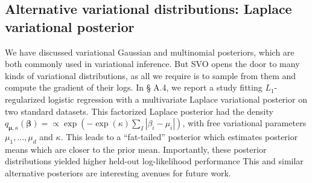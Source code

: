 \subsection{Alternative variational distributions: Laplace variational posterior}
\label{sec:complicated_posteriors}
We have discussed variational Gaussian and multinomial posteriors,
which are both commonly used in variational inference.  But SVO opens
the door to many kinds of variational distributions, as all we require
is to sample from them and compute the gradient of their logs.  In \S
A.4, we report a study fitting $L_1$-regularized logistic regression
with a multivariate Laplace variational posterior on two standard
datasets.  This factorized Laplace posterior had the density $q_{\bm
  \mu, \kappa}( \bm \beta ) = \propto \exp( - \exp(\kappa) \sum_I |
\beta_i - \mu_i | )$, with free variational parameters $\mu_1, \ldots,
\mu_d$ and $\kappa$.  This leads to a ``fat-tailed'' posterior which
estimates posterior means which are closer to the prior mean.  Importantly,
these posterior distributions yielded higher held-out log-likelihood
performance This and similar alternative posteriors are interesting
avenues for future work.



